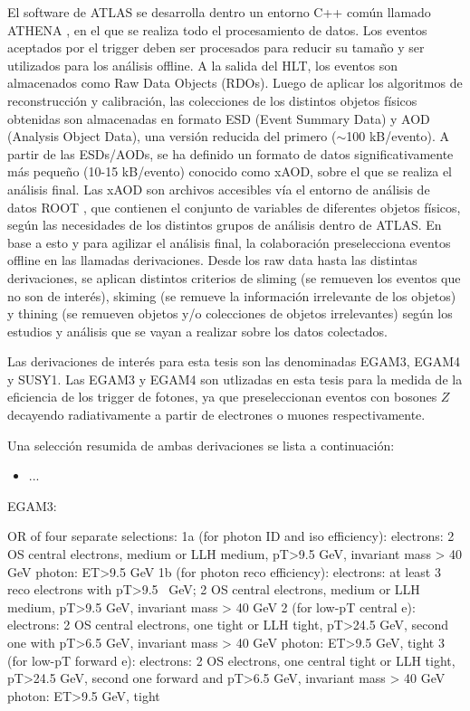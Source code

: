 El software de ATLAS se desarrolla dentro un entorno C++ común llamado ATHENA \cite{ATLAS-TDR-17, analysistools, athena}, en el que se realiza todo el procesamiento de datos. Los eventos aceptados por el trigger deben ser procesados para reducir su tamaño y ser utilizados para los análisis offline. A la salida del HLT, los eventos son almacenados como Raw Data Objects (RDOs). Luego de aplicar los algoritmos de reconstrucción y calibración, las colecciones de los distintos objetos físicos obtenidas son almacenadas en formato ESD (Event Summary Data) y AOD (Analysis Object Data), una versión reducida del primero ($\sim$100 kB/evento). A partir de las ESDs/AODs, se ha definido un formato de datos significativamente más pequeño (10-15 kB/evento) conocido como xAOD, sobre el que se realiza el análisis final. Las xAOD son archivos accesibles vía el entorno de análisis de datos ROOT \cite{root}, que contienen el conjunto de variables de diferentes objetos físicos, según las necesidades de los distintos grupos de análisis dentro de ATLAS. En base a esto y para agilizar el análisis final, la colaboración preselecciona eventos offline en las llamadas derivaciones. Desde los raw data hasta las distintas derivaciones, se aplican distintos criterios de sliming (se remueven los eventos que no son de interés), skiming (se remueve la información irrelevante de los objetos) y thining (se remueven objetos y/o colecciones de objetos irrelevantes) según los estudios y análisis que se vayan a realizar sobre los datos colectados.

Las derivaciones de interés para esta tesis son las denominadas EGAM3, EGAM4 y SUSY1. Las EGAM3 y EGAM4 son utlizadas en esta tesis para la medida de la eficiencia de los trigger de fotones, ya que preseleccionan eventos con bosones $Z$ decayendo radiativamente a partir de electrones o muones respectivamente. 

Una selección resumida de ambas derivaciones se lista a continuación:


\begin{itemize}
  \item ...
\end{itemize}
EGAM3:

    OR of four separate selections:
        1a (for photon ID and iso efficiency):
            electrons: 2 OS central electrons, medium or LLH medium, pT>9.5 GeV, invariant mass > 40 GeV
            photon: ET>9.5 GeV 
        1b (for photon reco efficiency):
            electrons: at least 3 reco electrons with pT>9.5 ~GeV; 2 OS central electrons, medium or LLH medium, pT>9.5 GeV, invariant mass > 40 GeV 
        2 (for low-pT central e):
            electrons: 2 OS central electrons, one tight or LLH tight, pT>24.5 GeV, second one with pT>6.5 GeV, invariant mass > 40 GeV
            photon: ET>9.5 GeV, tight 
        3 (for low-pT forward e):
            electrons: 2 OS electrons, one central tight or LLH tight, pT>24.5 GeV, second one forward and pT>6.5 GeV, invariant mass > 40 GeV
            photon: ET>9.5 GeV, tight 


